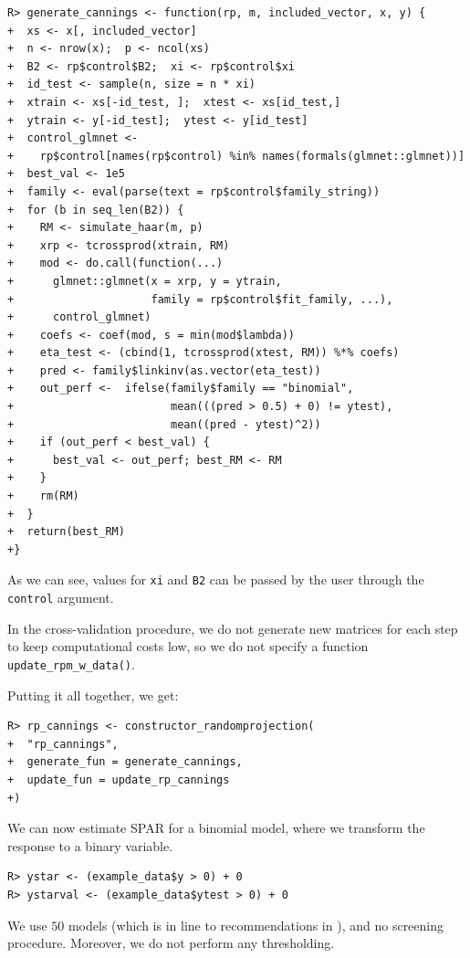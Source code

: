 \documentclass[
  article,
  nojss]{jss}
\begin{document}
\begin{verbatim}
R> generate_cannings <- function(rp, m, included_vector, x, y) {
+  xs <- x[, included_vector]
+  n <- nrow(x);  p <- ncol(xs)
+  B2 <- rp$control$B2;  xi <- rp$control$xi
+  id_test <- sample(n, size = n * xi)
+  xtrain <- xs[-id_test, ];  xtest <- xs[id_test,]
+  ytrain <- y[-id_test];  ytest <- y[id_test]
+  control_glmnet <-
+    rp$control[names(rp$control) %in% names(formals(glmnet::glmnet))]
+  best_val <- 1e5 
+  family <- eval(parse(text = rp$control$family_string))
+  for (b in seq_len(B2)) {
+    RM <- simulate_haar(m, p)
+    xrp <- tcrossprod(xtrain, RM)
+    mod <- do.call(function(...) 
+      glmnet::glmnet(x = xrp, y = ytrain, 
+                     family = rp$control$fit_family, ...),
+      control_glmnet)
+    coefs <- coef(mod, s = min(mod$lambda))
+    eta_test <- (cbind(1, tcrossprod(xtest, RM)) %*% coefs)
+    pred <- family$linkinv(as.vector(eta_test))
+    out_perf <-  ifelse(family$family == "binomial",
+                        mean(((pred > 0.5) + 0) != ytest), 
+                        mean((pred - ytest)^2))
+    if (out_perf < best_val) {
+      best_val <- out_perf; best_RM <- RM
+    }
+    rm(RM)
+  }
+  return(best_RM)
+}
\end{verbatim}

As we can see, values for \texttt{xi} and \texttt{B2} can be passed by
the user through the \texttt{control} argument.

In the cross-validation procedure, we do not generate new matrices for
each step to keep computational costs low, so we do not specify a
function \texttt{update\_rpm\_w\_data()}.

Putting it all together, we get:

\begin{verbatim}
R> rp_cannings <- constructor_randomprojection(
+  "rp_cannings",
+  generate_fun = generate_cannings,
+  update_fun = update_rp_cannings
+)
\end{verbatim}

We can now estimate SPAR for a binomial model, where we transform the
response to a binary variable.

\begin{verbatim}
R> ystar <- (example_data$y > 0) + 0
R> ystarval <- (example_data$ytest > 0) + 0
\end{verbatim}

We use \(50\) models (which is in line to recommendations in
\citet{cannings2017random}), and no screening procedure. Moreover, we do
not perform any thresholding.
\end{document}
